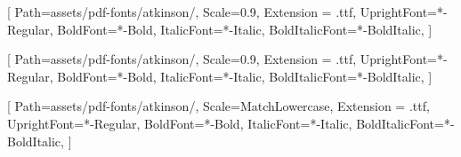 \setmainfont{AtkinsonHyperlegibleNext}[
    Path=assets/pdf-fonts/atkinson/,
    Scale=0.9,
    Extension = .ttf,
    UprightFont=*-Regular,
    BoldFont=*-Bold,
    ItalicFont=*-Italic,
    BoldItalicFont=*-BoldItalic,
    ]

\setsansfont{AtkinsonHyperlegibleNext}[
    Path=assets/pdf-fonts/atkinson/,
    Scale=0.9,
    Extension = .ttf,
    UprightFont=*-Regular,
    BoldFont=*-Bold,
    ItalicFont=*-Italic,
    BoldItalicFont=*-BoldItalic,
    ]

\setmonofont{AtkinsonHyperlegibleMono}[
    Path=assets/pdf-fonts/atkinson/,
    Scale=MatchLowercase,
    Extension = .ttf,
    UprightFont=*-Regular,
    BoldFont=*-Bold,
    ItalicFont=*-Italic,
    BoldItalicFont=*-BoldItalic,
    ]
